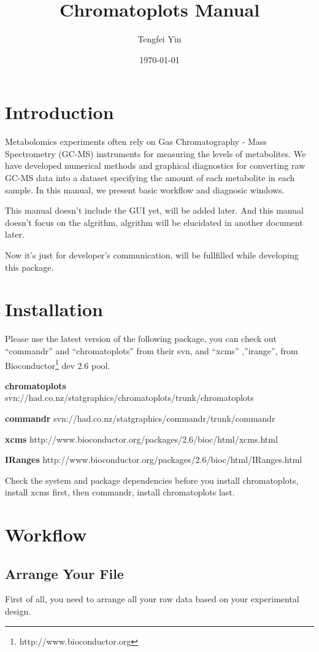 \documentclass[11pt,a4paper]{article}
\title{Chromatoplots Manual}
\author{Tengfei Yin}
\date{\today}
\begin{document}
\maketitle\newpage
\tableofcontents\newpage

\section{Introduction}
Metabolomics experiments often rely on Gas Chromatography - Mass
Spectrometry (GC-MS) instruments for measuring the levels of
metabolites. We have developed numerical methods and graphical
diagnostics for converting raw GC-MS data into a dataset specifying
the amount of each metabolite in each sample. In this manual, we
present basic workflow and diagnosic windows.

This manual doesn't include the GUI yet, will be added later. And this
manual doesn't focus on the algrithm, algrithm will be elucidated in
another document later.

Now it's just for developer's communication, will be fullfilled while
developing this package.

\section{Installation}

Please use the latest version of the following package, you can check
out ``commandr'' and ``chromatoplots'' from their svn, and ``xcms''
,''irange'', from
Bioconductor\footnote[1]{http://www.bioconductor.org} dev 2.6 pool.

\textbf{chromatoplots}
svn://had.co.nz/statgraphics/chromatoplots/trunk/chromatoplots

\textbf{commandr}
svn://had.co.nz/statgraphics/commandr/trunk/commandr

\textbf{xcms}
http://www.bioconductor.org/packages/2.6/bioc/html/xcms.html

\textbf{IRanges}
http://www.bioconductor.org/packages/2.6/bioc/html/IRanges.html

Check the system and package dependencies before you install chromatoplots,
install xcms first, then commandr, install chromatoplots last.

\section{Workflow}
\subsection{Arrange Your File}
First of all, you need to arrange all your raw data based on your
experimental design.
\end{document}
